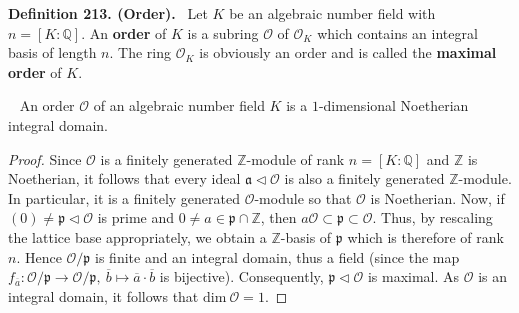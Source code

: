 \documentclass[12pt,a4paper,footinclude=true,headinclude=true]{scrbook} %
\newenvironment{proposition}[2][]
{\renewcommand\theinnercustomprop{#2}\innercustomprop[#1] 
\begin{mdframed}[backgroundcolor=gray!20]\ }
{\end{mdframed}\endinnercustomprop}
\newenvironment{definition}[2][Definition]
    { \begin{mdframed}[backgroundcolor=gray!20] \textbf{#1 #2.}\ }
    {  \end{mdframed}}
\begin{document}
\begin{definition}{213. (Order)}
    Let $K$ be an algebraic number field with $n=[K:\mathbb{Q}]$. An \textbf{order} of $K$ is a subring $\mathcal{O}$ of $\mathcal{O}_K$ which contains an integral basis of length $n$. The ring $\mathcal{O}_K$ is obviously an order and is called the \textbf{maximal order} of $K$.
\end{definition}

\begin{proposition}{214}
    An order $\mathcal{O}$ of an algebraic number field $K$ is a $1$-dimensional Noetherian integral domain.
\end{proposition}
\begin{proof}
    Since $\mathcal{O}$ is a finitely generated $\mathbb{Z}$-module of rank $n=[K:\mathbb{Q}]$ and $\mathbb{Z}$ is Noetherian, it follows that every ideal $\mathfrak{a}\triangleleft\mathcal{O}$ is also a finitely generated $\mathbb{Z}$-module. In particular, it is a finitely generated $\mathcal{O}$-module so that $\mathcal{O}$ is Noetherian. Now, if $(0)\neq\mathfrak{p}\triangleleft\mathcal{O}$ is prime and $0\neq a\in\mathfrak{p}\cap\mathbb{Z}$, then $a\mathcal{O}\subset\mathfrak{p}\subset\mathcal{O}$. Thus, by rescaling the lattice base appropriately, we obtain a $\mathbb{Z}$-basis of $\mathfrak{p}$ which is therefore of rank $n$. Hence $\mathcal{O}/\mathfrak{p}$ is finite and an integral domain, thus a field (since the map $f_{\overline{a}}:\mathcal{O}/\mathfrak{p}\to\mathcal{O}/\mathfrak{p},\ \overline{b}\mapsto\overline{a}\cdot\overline{b}$ is bijective). Consequently, $\mathfrak{p}\triangleleft\mathcal{O}$ is maximal. As $\mathcal{O}$ is an integral domain, it follows that $\mathrm{dim}\ \mathcal{O}=1$.
\end{proof}
\end{document}
